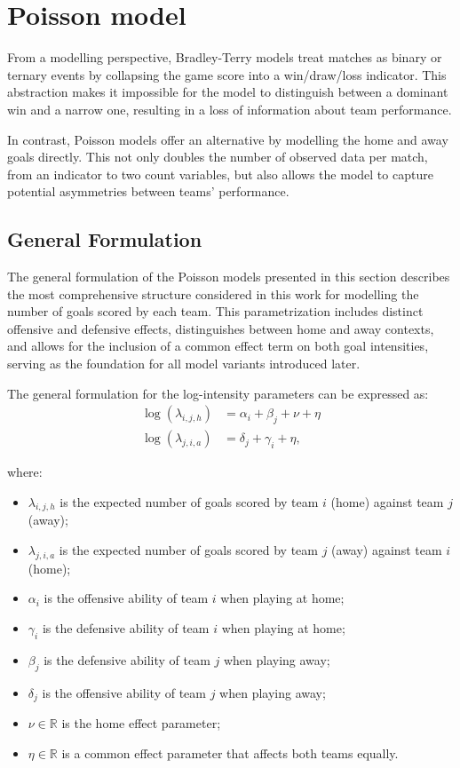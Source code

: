 \section{Poisson model}
\label{sec:Poisson_model}

From a modelling perspective, Bradley-Terry models treat matches as binary or ternary events by collapsing the game score into a win/draw/loss indicator.
This abstraction makes it impossible for the model to distinguish between a dominant win and a narrow one, resulting in a loss of information about team performance.

In contrast, Poisson models \cite{maher_1982, dixon_1997, lee_1997, karlis_2000} offer an alternative by modelling the home and away goals directly.
This not only doubles the number of observed data per match, from an indicator to two count variables, but also allows the model to capture potential asymmetries between teams' performance.

\subsection{General Formulation}
\label{sec:Poisson_general_formulation}

The general formulation of the Poisson models presented in this section describes the most comprehensive structure considered in this work for modelling the number of goals scored by each team.
This parametrization includes distinct offensive and defensive effects, distinguishes between home and away contexts, and allows for the inclusion of a common effect term on both goal intensities, serving as the foundation for all model variants introduced later.

The general formulation for the log-intensity parameters can be expressed as:
\begin{align}
    \label{eq:poisson_general_home}
    \log(\lambda_{i,j,h}) &= \alpha_i + \beta_j + \nu + \eta \\
    \label{eq:poisson_general_away}
    \log(\lambda_{j,i,a}) &= \delta_j + \gamma_i + \eta,
\end{align}

where:
\begin{itemize}
    \item $\lambda_{i,j,h}$ is the expected number of goals scored by team $i$ (home) against team $j$ (away);
    \item $\lambda_{j,i,a}$ is the expected number of goals scored by team $j$ (away) against team $i$ (home);
    \item $\alpha_i$ is the offensive ability of team $i$ when playing at home;
    \item $\gamma_i$ is the defensive ability of team $i$ when playing at home;
    \item $\beta_j$ is the defensive ability of team $j$ when playing away;
    \item $\delta_j$ is the offensive ability of team $j$ when playing away;
    \item $\nu \in \mathbb{R}$ is the home effect parameter;
    \item $\eta \in \mathbb{R}$ is a common effect parameter that affects both teams equally.
\end{itemize}

